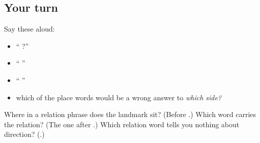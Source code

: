 \subsection*{Your turn}
Say these aloud:

\begin{itemize}
\raggedright
  \item \textquotedblleft{}  ?\textquotedblright{}
  \item \textquotedblleft{}   \textquotedblright{}
  \item \textquotedblleft{}         \textquotedblright{}
  \item which of the place words would be a wrong answer to \emph{which side?}
\end{itemize}

\begin{tcolorbox}[breakable,colback=teal!4,colframe=teal!35!black,title={Before you move on}]
Where in a relation phrase does the landmark sit? (Before \textbf{}.) Which word carries the relation? (The one after \textbf{}.) Which relation word tells you nothing about direction? (\textbf{}.)
\end{tcolorbox}
